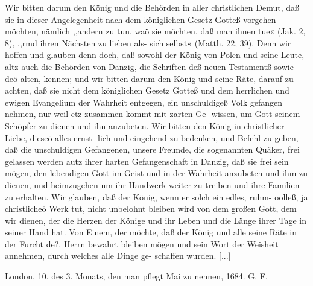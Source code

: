 {    Wir bitten darum den König und die Behörden in aller
    christlichen Demut, daß sie in dieser Angelegenheit nach dem
    königlichen Gesetz Gotteß vorgehen möchten, nämlich ,,andern zu
    tun, waö sie möchten, daß man ihnen tue« (Jak. 2, 8), ,,rmd
    ihren Nächsten zu lieben als- sich selbst« (Matth. 22, 39). Denn
    wir hoffen und glauben denn doch, daß sowohl der König von
    Polen und seine Leute, altz auch die Behörden von Danzig, die
    Schriften deß neuen Testamentß sowie deö alten, kennen; und wir
    bitten darum den König und seine Räte, darauf zu achten, daß
    sie nicht dem königlichen Gesetz Gotteß und dem herrlichen und
    ewigen Evangelium der Wahrheit entgegen, ein unschuldigeß Volk
    gefangen nehmen, nur weil etz zusammen kommt mit zarten Ge-
    wissen, um Gott seinem Schöpfer zu dienen und ihn anzubeten.
    Wir bitten den König in christlicher Liebe, dieseö alles ernst-
    lich und eingehend zu bedenken, und Befehl zu geben, daß die
    unschuldigen Gefangenen, unsere Freunde, die sogenannten Quäker,
    frei gelassen werden autz ihrer harten Gefangenschaft in Danzig,
    daß sie frei sein mögen, den lebendigen Gott im Geist und in der
    Wahrheit anzubeten und ihm zu dienen, und heimzugehen um
    ihr Handwerk weiter zu treiben und ihre Familien zu erhalten.
    Wir glauben, daß der König, wenn er solch ein edles, ruhm-
    oolleß, ja christlicheö Werk tut, nicht unbelohnt bleiben wird
    von dem großen Gott, dem wir dienen, der die Herzen der
    Könige und ihr Leben und die Länge ihrer Tage in seiner
    Hand hat.
    Von Einem, der möchte, daß der König und alle seine
    Räte in der Furcht de?. Herrn bewahrt bleiben mögen und
    sein Wort der Weisheit annehmen, durch welches alle Dinge ge-
    schaffen wurden. [...]
    \bigskip
    \begin{flushright}
    London, 10. des 3. Monats, den man pflegt Mai zu nennen, 1684.
    G. F.\end{flushright}
}


